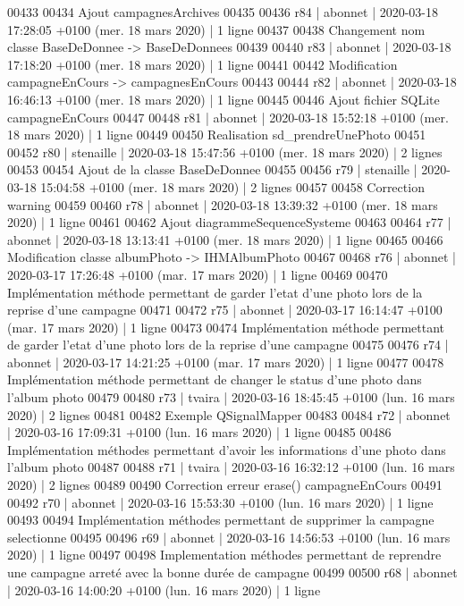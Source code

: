 \begin{DoxyCode}
00433 
00434 Ajout campagnesArchives
00435 
00436 r84 | abonnet | 2020-03-18 17:28:05 +0100 (mer. 18 mars 2020) | 1 ligne
00437 
00438 Changement nom classe BaseDeDonnee -> BaseDeDonnees
00439 
00440 r83 | abonnet | 2020-03-18 17:18:20 +0100 (mer. 18 mars 2020) | 1 ligne
00441 
00442 Modification campagneEnCours -> campagnesEnCours
00443 
00444 r82 | abonnet | 2020-03-18 16:46:13 +0100 (mer. 18 mars 2020) | 1 ligne
00445 
00446 Ajout fichier SQLite campagneEnCours
00447 
00448 r81 | abonnet | 2020-03-18 15:52:18 +0100 (mer. 18 mars 2020) | 1 ligne
00449 
00450 Realisation sd\_prendreUnePhoto
00451 
00452 r80 | stenaille | 2020-03-18 15:47:56 +0100 (mer. 18 mars 2020) | 2 lignes
00453 
00454 Ajout de la classe BaseDeDonnee
00455 
00456 r79 | stenaille | 2020-03-18 15:04:58 +0100 (mer. 18 mars 2020) | 2 lignes
00457 
00458 Correction warning
00459 
00460 r78 | abonnet | 2020-03-18 13:39:32 +0100 (mer. 18 mars 2020) | 1 ligne
00461 
00462 Ajout diagrammeSequenceSysteme
00463 
00464 r77 | abonnet | 2020-03-18 13:13:41 +0100 (mer. 18 mars 2020) | 1 ligne
00465 
00466 Modification classe albumPhoto -> IHMAlbumPhoto
00467 
00468 r76 | abonnet | 2020-03-17 17:26:48 +0100 (mar. 17 mars 2020) | 1 ligne
00469 
00470 Implémentation méthode permettant de garder l'etat d'une photo lors de la reprise d'une campagne
00471 
00472 r75 | abonnet | 2020-03-17 16:14:47 +0100 (mar. 17 mars 2020) | 1 ligne
00473 
00474 Implémentation méthode permettant de garder l'etat d'une photo lors de la reprise d'une campagne
00475 
00476 r74 | abonnet | 2020-03-17 14:21:25 +0100 (mar. 17 mars 2020) | 1 ligne
00477 
00478 Implémentation méthode permettant de changer le status d'une photo dans l'album photo
00479 
00480 r73 | tvaira | 2020-03-16 18:45:45 +0100 (lun. 16 mars 2020) | 2 lignes
00481 
00482 Exemple QSignalMapper
00483 
00484 r72 | abonnet | 2020-03-16 17:09:31 +0100 (lun. 16 mars 2020) | 1 ligne
00485 
00486 Implémentation méthodes permettant d'avoir les informations d'une photo dans l'album photo
00487 
00488 r71 | tvaira | 2020-03-16 16:32:12 +0100 (lun. 16 mars 2020) | 2 lignes
00489 
00490 Correction erreur erase() campagneEnCours
00491 
00492 r70 | abonnet | 2020-03-16 15:53:30 +0100 (lun. 16 mars 2020) | 1 ligne
00493 
00494 Implémentation méthodes permettant de supprimer la campagne selectionne
00495 
00496 r69 | abonnet | 2020-03-16 14:56:53 +0100 (lun. 16 mars 2020) | 1 ligne
00497 
00498 Implementation méthodes permettant de reprendre une campagne arreté avec la bonne durée de campagne
00499 
00500 r68 | abonnet | 2020-03-16 14:00:20 +0100 (lun. 16 mars 2020) | 1 ligne

\end{DoxyCode}
